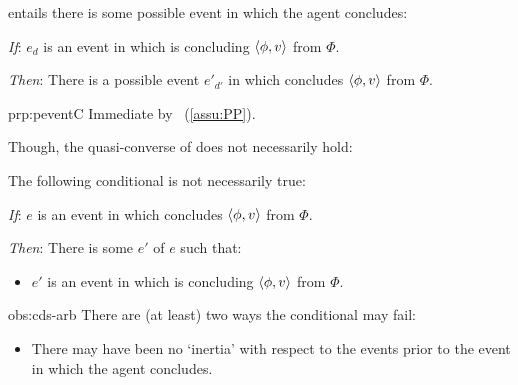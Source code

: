 \begin{note}
   entails there is some possible event in which the agent concludes:

  \begin{proposition}%
    \label{prp:peventC}%
    \vspace{-\baselineskip}
    \begin{itenum}
    \item[\emph{If}:]
      \(e_{d}\) is an event in which \vAgent{} is concluding \(\langle \phi, v \rangle\) from \(\Phi\).
    \item[\emph{Then}:]
      There is a possible event \(e'_{d'}\) in which \vAgent{} concludes \(\langle \phi, v \rangle\) from \(\Phi\).
    \end{itenum}
    \vspace{-\baselineskip}
  \end{proposition}

  \begin{argument}{prp:peventC}
    Immediate by \assuPP{}~(\autoref{assu:PP}).
  \end{argument}

  \noindent%
  Though, the quasi-converse of \assuPP{} does not necessarily hold:

  \begin{observation}%
    \label{obs:cds-arb}%
    The following conditional is not necessarily true:
    \begin{itenum}
    \item[\emph{If}:]
      \(e\) is an event in which \vAgent{} concludes \(\langle \phi, v \rangle\) from \(\Phi\).
    \item[\emph{Then}:]
      There is some  \(e'\) of \(e\) such that:
      \begin{itemize}
      \item
        \(e'\) is an event in which \vAgent{} is concluding \(\langle \phi, v \rangle\) from \(\Phi\).
      \end{itemize}
    \end{itenum}
    \vspace{-\baselineskip}
  \end{observation}

  \begin{motivation}{obs:cds-arb}
    There are (at least) two ways the conditional may fail:

    \begin{itemize}
    \item
      There may have been no `inertia' with respect to the events prior to the event in which the agent concludes.


\end{itemize}
\end{motivation}
\end{note}

